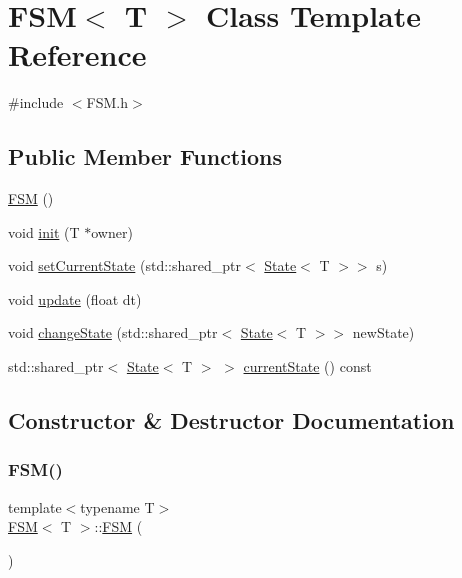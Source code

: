 \hypertarget{class_f_s_m}{}\section{F\+SM$<$ T $>$ Class Template Reference}
\label{class_f_s_m}


{\ttfamily \#include $<$F\+S\+M.\+h$>$}

\subsection*{Public Member Functions}
\begin{DoxyCompactItemize}
\item 
\hyperlink{class_f_s_m_a29759e509b7dd9157c80ac31c3f95073}{F\+SM} ()
\item 
void \hyperlink{class_f_s_m_a8e498afa4815129fb8415cddf53a4598}{init} (T $\ast$owner)
\item 
void \hyperlink{class_f_s_m_a61ae5e4ce16b7bbef3cb940ac5e52cf5}{set\+Current\+State} (std\+::shared\+\_\+ptr$<$ \hyperlink{class_state}{State}$<$ T $>$$>$ s)
\item 
void \hyperlink{class_f_s_m_aab9a474b025a5e8e813fc2948d229568}{update} (float dt)
\item 
void \hyperlink{class_f_s_m_a241c2f5192c96fe2c24b319dd5a3f64b}{change\+State} (std\+::shared\+\_\+ptr$<$ \hyperlink{class_state}{State}$<$ T $>$$>$ new\+State)
\item 
std\+::shared\+\_\+ptr$<$ \hyperlink{class_state}{State}$<$ T $>$ $>$ \hyperlink{class_f_s_m_a5fcece234f05f8cbeeb650f01a842c51}{current\+State} () const
\end{DoxyCompactItemize}


\subsection{Constructor \& Destructor Documentation}
\mbox{\label{class_f_s_m_a29759e509b7dd9157c80ac31c3f95073}} 
\subsubsection{\texorpdfstring{F\+S\+M()}{FSM()}}
{\footnotesize\ttfamily template$<$typename T$>$ \\
\hyperlink{class_f_s_m}{F\+SM}$<$ T $>$\+::\hyperlink{class_f_s_m}{F\+SM} (\begin{DoxyParamCaption}{ }\end{DoxyParamCaption})\hspace{0.3cm}{\ttfamily [inline]}}



